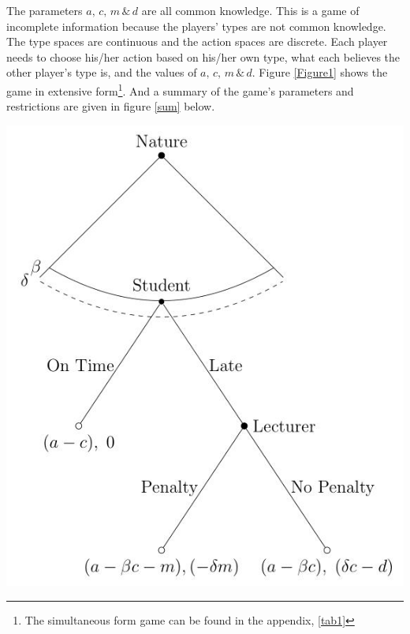 \documentclass[11pt,preprint, authoryear]{elsarticle}
\let\origfigure\figure
\let\endorigfigure\endfigure
\renewenvironment{figure}[1][2] {
    \expandafter\origfigure\expandafter[H]
} {
    \endorigfigure
}
\numberwithin{equation}{section}
\numberwithin{figure}{section}
\numberwithin{table}{section}
\let\rmarkdownfootnote\footnote%
\def\footnote{\protect\rmarkdownfootnote}
\begin{document}
The parameters \(a,\, c,\, m\, \&\, d\) are all common knowledge. This
is a game of incomplete information because the players' types are not
common knowledge. The type spaces are continuous and the action spaces
are discrete. Each player needs to choose his/her action based on
his/her own type, what each believes the other player's type is, and the
values of \(a,\, c,\, m\, \&\, d\). Figure \ref{Figure1} shows the game
in extensive form\footnote{The simultaneous form game can be found in
  the appendix, \ref{tab1}}. And a summary of the game's parameters and
restrictions are given in figure \ref{sum} below.

\begin{figure}[H]

{\centering \includegraphics{img/continuous} 

}

\caption{This game is dynamic, where nature first chooses the student's and lecturer's types. The dashed line represents information only known by the lecturer and the solid line represents information only known by the student. Then the student moves, deciding to hand in on time or late after experiencing a crisis. If the student hands in late, the lecturer decides to impose a penalty or not. \label{Figure1}}\label{fig:Figure1}
\end{figure}
\end{document}
